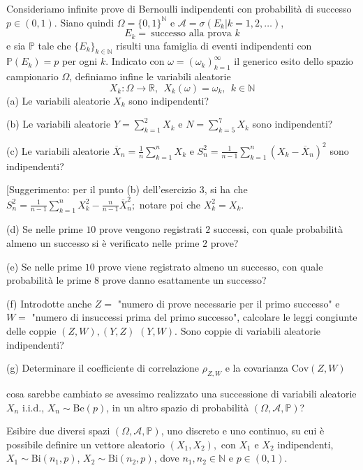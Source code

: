 Consideriamo infinite prove di Bernoulli indipendenti con probabilità di successo $p\in (0,1)$. Siano quindi $\Omega =\{0,1\}^{\mathbb{N}}$ e $\mathcal{A} =\sigma ( E_{k} |k=1,2,\dotsc )$,
\begin{equation*}
E_{k} =\ \text{successo alla prova } k
\end{equation*}
e sia $\mathbb{P}$ tale che $\{E_{k}\}_{k\in \mathbb{N}}$ risulti una famiglia di eventi indipendenti con $\mathbb{P}( E_{k}) =p$ per ogni $k$. Indicato con $\omega =( \omega _{k})_{k=1}^{\infty }$ il generico esito dello spazio campionario $\Omega $, definiamo infine le variabili aleatorie
\begin{equation*}
X_{k} :\Omega \rightarrow \mathbb{R} ,\ \ X_{k} (\omega )=\omega _{k} ,\ \ k\in \mathbb{N}
\end{equation*}
(a) Le variabili aleatorie $X_{k}$ sono indipendenti?

(b) Le variabili aleatorie $Y=\sum _{k=1}^{2} X_{k}$ e $N=\sum _{k=5}^{7} X_{k}$ sono indipendenti?

(c) Le variabili aleatorie $\overline{X}_{n} =\frac{1}{n}\sum _{k=1}^{n} X_{k}$ e $S_{n}^{2} =\frac{1}{n-1}\sum _{k=1}^{n}( X_{k} -\overline{X}_{n})^{2}$ sono indipendenti?

[Suggerimento: per il punto (b) dell'esercizio 3, si ha che $S_{n}^{2} =\frac{1}{n-1}\sum _{k=1}^{n} X_{k}^{2} -\frac{n}{n-1}\overline{X}_{n}^{2} ;$ notare poi che $X_{k}^{2} =X_{k}$.

(d) Se nelle prime $10$ prove vengono registrati $2$ successi, con quale probabilità almeno un successo si è verificato nelle prime $2$ prove?

(e) Se nelle prime $10$ prove viene registrato almeno un successo, con quale probabilità le prime $8$ prove danno esattamente un successo?

(f) Introdotte anche $Z=$ "numero di prove necessarie per il primo successo" e $W=$ "numero di insuccessi prima del primo successo", calcolare le leggi congiunte delle coppie $(Z,W),(Y,Z)$ $(Y,W).$ Sono coppie di variabili aleatorie indipendenti?

(g) Determinare il coefficiente di correlazione $\rho _{Z,W}$ e la covarianza $\mathrm{Cov} (Z,W)$

cosa sarebbe cambiato se avessimo realizzato una successione di variabili aleatorie $X_{n}$ i.i.d., $X_{n} \sim \mathrm{Be} (p)$, in un altro spazio di probabilità $(\Omega ,\mathcal{A} ,\mathbb{P} )$?
\Esercizio{}

Esibire due diversi spazi $(\Omega ,\mathcal{A} ,\mathbb{P} )$, uno discreto e uno continuo, su cui è possibile definire un vettore aleatorio $( X_{1} ,X_{2}) ,$ con $X_{1}$ e $X_{2}$ indipendenti, $X_{1} \sim \mathrm{Bi}( n_{1} ,p)$, $X_{2} \sim \mathrm{Bi}( n_{2} ,p)$, dove $n_{1} ,n_{2} \in \mathbb{N}$ e $p\in (0,1)$.
\Esercizio{}

